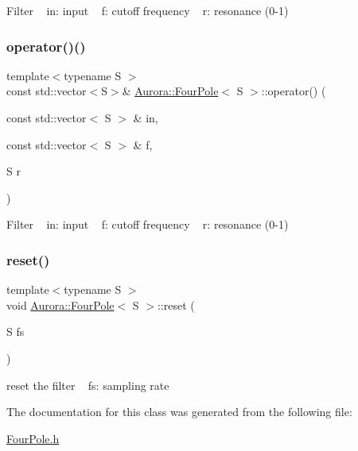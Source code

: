 Filter ~\newline
in\+: input ~\newline
f\+: cutoff frequency ~\newline
r\+: resonance (0-\/1) \mbox{\label{class_aurora_1_1_four_pole_a300ec87b54b5e8c5c76c1005fe31c9d9}} 
\subsubsection{\texorpdfstring{operator()()}{operator()()}\hspace{0.1cm}{\footnotesize\ttfamily [2/2]}}
{\footnotesize\ttfamily template$<$typename S $>$ \\
const std\+::vector$<$S$>$\& \hyperlink{class_aurora_1_1_four_pole}{Aurora\+::\+Four\+Pole}$<$ S $>$\+::operator() (\begin{DoxyParamCaption}\item[{const std\+::vector$<$ S $>$ \&}]{in,  }\item[{const std\+::vector$<$ S $>$ \&}]{f,  }\item[{S}]{r }\end{DoxyParamCaption})\hspace{0.3cm}{\ttfamily [inline]}}

Filter ~\newline
in\+: input ~\newline
f\+: cutoff frequency ~\newline
r\+: resonance (0-\/1) \mbox{\label{class_aurora_1_1_four_pole_a5de080ccd74617a6bfba13d3d76bcb4b}} 
\subsubsection{\texorpdfstring{reset()}{reset()}}
{\footnotesize\ttfamily template$<$typename S $>$ \\
void \hyperlink{class_aurora_1_1_four_pole}{Aurora\+::\+Four\+Pole}$<$ S $>$\+::reset (\begin{DoxyParamCaption}\item[{S}]{fs }\end{DoxyParamCaption})\hspace{0.3cm}{\ttfamily [inline]}}

reset the filter ~\newline
fs\+: sampling rate 

The documentation for this class was generated from the following file\+:\begin{DoxyCompactItemize}
\item 
\hyperlink{_four_pole_8h}{Four\+Pole.\+h}\end{DoxyCompactItemize}
